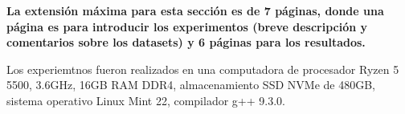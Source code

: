 \begin{mdframed}
    \textbf{La extensión máxima para esta sección es de 7 páginas, donde una página es para introducir los experimentos (breve descripción y comentarios sobre los datasets) y 6 páginas para los resultados.}
\end{mdframed}

Los experiemtnos fueron realizados en una computadora de procesador Ryzen 5 5500, 3.6GHz, 16GB RAM DDR4, almacenamiento SSD NVMe de 480GB, sistema operativo Linux Mint 22, compilador g++ 9.3.0.
